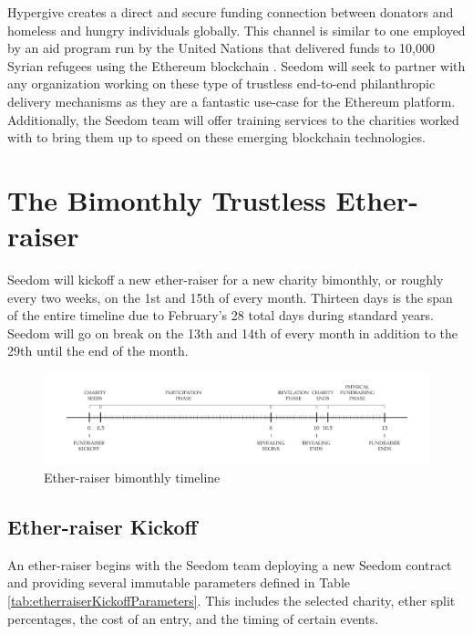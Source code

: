 \documentclass[11pt]{article}
\begin{document}
Hypergive creates a direct and secure funding connection between donators and homeless and hungry individuals globally. This channel is similar to one employed by an aid program run by the United Nations that delivered funds to 10,000 Syrian refugees using the Ethereum blockchain \cite{6}. Seedom will seek to partner with any organization working on these type of trustless end-to-end philanthropic delivery mechanisms as they are a fantastic use-case for the Ethereum platform. Additionally, the Seedom team will offer training services to the charities worked with to bring them up to speed on these emerging blockchain technologies.

\section{The Bimonthly Trustless Ether-raiser}

Seedom will kickoff a new ether-raiser for a new charity bimonthly, or roughly every two weeks, on the 1st and 15th of every month. Thirteen days is the span of the entire timeline due to February's 28 total days during standard years. Seedom will go on break on the 13th and 14th of every month in addition to the 29th until the end of the month.

\begin{figure}[H]
\begin{center}
\includegraphics[width=1.0\textwidth]{./graphics/etherraiserBimonthlyTimeline.pdf}
\caption{Ether-raiser bimonthly timeline}
\label{figure:etherraiserBimonthlyTimeline}
\end{center}
\end{figure}

\subsection{Ether-raiser Kickoff}

An ether-raiser begins with the Seedom team deploying a new Seedom contract and providing several immutable parameters defined in Table \ref{tab:etherraiserKickoffParameters}. This includes the selected charity, ether split percentages, the cost of an entry, and the timing of certain events.
\end{document}

